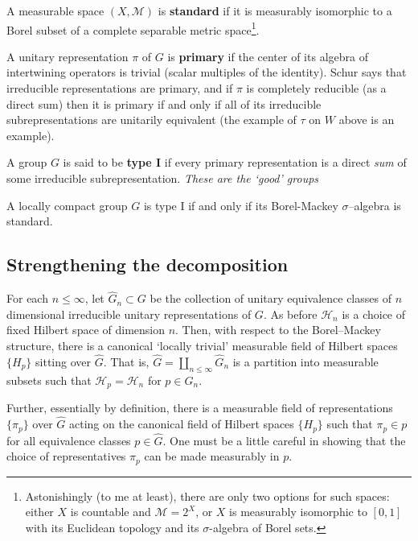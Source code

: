 \documentclass[11pt]{amsart}
\newcommand{\M}{\mathcal{M}}
\renewcommand{\H}{\mathcal{H}}
\begin{document}
\par A measurable space $(X,\M)$ is {\bf standard} if it is measurably isomorphic to a Borel subset of a complete separable metric space\footnote{Astonishingly (to me at least), there are only two options for such spaces: either $X$ is countable and $\M=2^{X}$, or $X$ is measurably isomorphic to $[0,1]$ with its Euclidean topology and its $\sigma$-algebra of Borel sets.}.

\par A unitary representation $\pi$ of $G$ is {\bf primary} if the center of its algebra of intertwining operators is trivial (scalar multiples of the identity). Schur says that irreducible representations are primary, and if $\pi$ is completely reducible (as a direct sum) then it is primary if and only if all of its irreducible subrepresentations are unitarily equivalent (the example of $\tau$ on $W$ above is an example).

\par A group $G$ is said to be {\bf type I} if every primary representation is a direct \emph{sum} of some irreducible subrepresentation. \emph{These are the `good' groups}

\begin{thm}
	A locally compact group $G$ is type I if and only if its Borel-Mackey  $\sigma$--algebra is standard. 
\end{thm}
 \subsection{Strengthening the decomposition}
For each $n\leq \infty$, let $\hat{G}_{n} \subset G$ be the collection of unitary equivalence classes of $n$ dimensional irreducible unitary representations of $G$. As before $\H_{n}$ is a choice of fixed Hilbert space of dimension $n$. Then, with respect to the Borel--Mackey structure, there is a canonical `locally trivial' measurable field of Hilbert spaces $\{ H_{p}\}$ sitting over $\hat{G}$. That is, $\hat{G}=\coprod_{n \leq \infty} \hat{G}_{n}$ is a partition into measurable subsets such that $\H_{p}=\H_{n}$ for $p \in \hat{G}_{n}$.

\par Further, essentially by definition, there is a measurable field of representations $\{\pi_{p}\}$ over $\hat{G}$ acting on the canonical field of Hilbert spaces $\{ H_{p}\}$ such that $\pi_{p} \in p$ for all equivalence classes $p\in \hat{G}$. One must be a little careful in showing that the choice of representatives $\pi_{p}$ can be made measurably in $p$.
\end{document}
